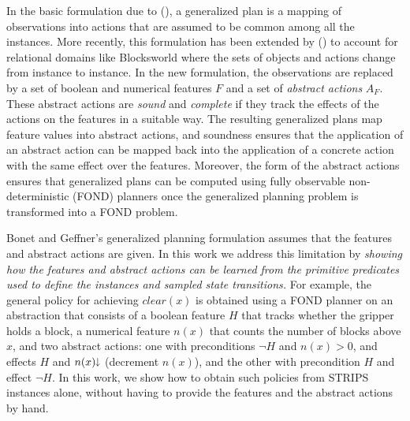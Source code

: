 \documentclass[letterpaper]{article} %
\newcommand{\Omit}[1]{}
\newcommand{\citeay}[1]{\citeauthor{#1} (\citeyear{#1})}
\newcommand{\mminus}{\hspace{-.05em}\raisebox{.15ex}{\footnotesize$\downarrow$}}
\begin{document}
In the basic formulation due  to \citeay{hu:generalized}, a generalized plan
is a mapping of observations into actions that are assumed to be common
among  all the instances. More recently, this formulation has been extended by
\citeay{bonet:ijcai2018} to account for relational domains like Blocksworld  where the sets of
objects and  actions change from instance to instance.
In the new formulation, the observations  are replaced by  a set of boolean
and numerical features $F$ and a set of \emph{abstract actions} $A_F$.
These abstract actions are  \emph{sound} and \emph{complete} if they track the
effects  of the actions on  the features in a suitable way.
The resulting generalized plans  map feature values into abstract actions, and soundness
ensures that the application of an abstract action can be mapped back into the application of
a concrete action with the same effect  over the features. Moreover, the form of the abstract actions
ensures that generalized plans can be computed using fully observable non-deterministic (FOND) planners
once the generalized planning problem is transformed into a FOND problem.

\Omit{
Abstract actions can increase or decrease numerical variables  $n$
associated with the numerical features (e.g., number of blocks above $x$), and while
increments  are transformed into deterministic propositional  effects $n > 0$ where $n > 0$ is
the negation of the proposition $n=0$, decrements  are  transformed  into
non-deterministic (disjunctive)  propositional effects $n > 0 \, | \, n=0$. 
}

Bonet and Geffner's generalized planning formulation assumes that the
features and abstract actions are given. In this work we address this limitation
by  \emph{showing  how the features and abstract actions  can be learned from
the primitive predicates used to define the instances and sampled state transitions.}
For example,  the general policy for achieving $clear(x)$ %
is obtained using a FOND planner on an abstraction that consists of  a  boolean
feature $H$  that tracks whether the gripper holds a block,  a numerical feature
$n(x)$ that counts the number of blocks above $x$, and two abstract actions:
one with preconditions $\neg H$ and $n(x) > 0$, and effects $H$ and $n(x)\mminus$
(decrement $n(x)$), and the other with precondition $H$ and effect $\neg H$.
In this work, we show how to obtain such policies from STRIPS instances alone,
without having to provide the features and the abstract actions by hand.
\end{document}
